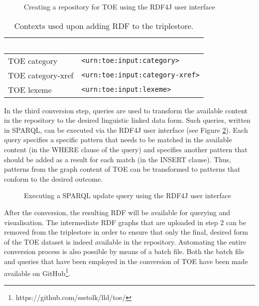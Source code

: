 \begin{figure}[htbp]
	\framebox[\textwidth]{
		\scalebox{0.65}[0.65]{
%			
		}
	}
	\caption[]{\label{fig:Stolk2019b:RDF4J-repo} Creating a repository for TOE using the RDF4J user interface}
\end{figure}



\begin{center}
\begin{table}[ht]
\centering
\begin{tabular}{|l|l|} 
\hline
\rowcolor{lightgray}
\textcolor{white}{Table of origin} & \textcolor{white}{Context} \\ \hline
TOE category & \texttt{<urn:toe:input:category>} \\ \hline
TOE category-xref & \texttt{<urn:toe:input:category-xref>} \\ \hline
TOE lexeme & \texttt{<urn:toe:input:lexeme>} \\ \hline
\end{tabular}
\caption{Contexts used upon adding RDF to the triplestore.\label{table:Stolk2019b:ConvStep2-Contexts}}
\end{table}
\end{center}




In the third conversion step, queries are used to transform the available content in the repository to the desired linguistic linked data form. Such queries, written in SPARQL, can be executed via the RDF4J user interface (see Figure \ref{fig:Stolk2019b:RDF4J-query}). Each query specifies a specific pattern that needs to be matched in the available content (in the WHERE clause of the query) and specifies another pattern that should be added as a result for each match (in the INSERT clause). Thus, patterns from the graph content of TOE can be transformed to patterns that conform to the desired outcome. 

\begin{figure}[htbp]
	\framebox[\textwidth]{
		\scalebox{0.65}[0.65]{
%			
		}
	}
	\caption[]{\label{fig:Stolk2019b:RDF4J-query} Executing a SPARQL update query using the RDF4J user interface}
\end{figure}

After the conversion, the resulting RDF will be available for querying and visualisation. The intermediate RDF graphs that are uploaded in step 2 can be removed from the triplestore in order to ensure that only the final, desired form of the TOE dataset is indeed available in the repository. Automating the entire conversion process is also possible by means of a batch file. Both the batch file and queries that have been employed in the conversion of TOE have been made available on GitHub\footnote{https://github.com/ssstolk/lld/toe/}.

